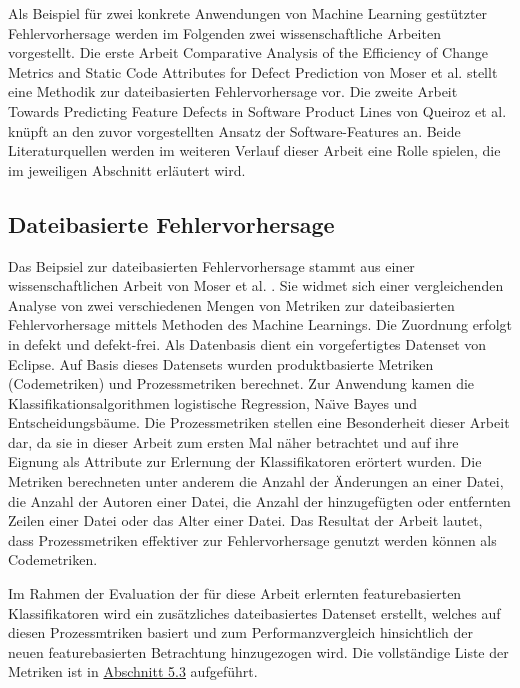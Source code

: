 Als Beispiel für zwei konkrete Anwendungen von Machine Learning gestützter Fehlervorhersage werden im Folgenden zwei wissenschaftliche Arbeiten vorgestellt. Die erste Arbeit \glqq Comparative Analysis of the Efficiency of Change Metrics and Static Code Attributes for Defect Prediction\grqq{} von Moser et al. \cite{Moser2008} stellt eine Methodik zur dateibasierten Fehlervorhersage vor. Die zweite Arbeit \glqq Towards Predicting Feature Defects in Software Product Lines\grqq{} von Queiroz et al. \cite{Queiroz2016} knüpft an den zuvor vorgestellten Ansatz der Software-Features an. Beide Literaturquellen werden im weiteren Verlauf dieser Arbeit eine Rolle spielen, die im jeweiligen Abschnitt erläutert wird.

\subsection*{Dateibasierte Fehlervorhersage}
Das Beipsiel zur dateibasierten Fehlervorhersage stammt aus einer wissenschaftlichen Arbeit von Moser et al. \cite{Moser2008}. Sie widmet sich einer vergleichenden Analyse von zwei verschiedenen Mengen von Metriken zur dateibasierten Fehlervorhersage mittels Methoden des Machine Learnings. Die Zuordnung erfolgt in \glqq defekt\grqq{} und \glqq defekt-frei\grqq. Als Datenbasis dient ein vorgefertigtes Datenset von Eclipse. Auf Basis dieses Datensets wurden \glqq produktbasierte\grqq{} Metriken (Codemetriken) und Prozessmetriken berechnet. Zur Anwendung kamen die Klassifikationsalgorithmen logistische Regression, Na\"{\i}ve Bayes und Entscheidungsbäume. Die Prozessmetriken stellen eine Besonderheit dieser Arbeit dar, da sie in dieser Arbeit zum ersten Mal näher betrachtet und auf ihre Eignung als Attribute zur Erlernung der Klassifikatoren erörtert wurden. Die Metriken berechneten unter anderem die Anzahl der Änderungen an einer Datei, die Anzahl der Autoren einer Datei, die Anzahl der hinzugefügten oder entfernten Zeilen einer Datei oder das Alter einer Datei. Das Resultat der Arbeit lautet, dass Prozessmetriken effektiver zur Fehlervorhersage genutzt werden können als Codemetriken.

Im Rahmen der Evaluation der für diese Arbeit erlernten featurebasierten Klassifikatoren wird ein zusätzliches dateibasiertes Datenset erstellt, welches auf diesen Prozessmtriken basiert und zum Performanzvergleich hinsichtlich der neuen featurebasierten Betrachtung hinzugezogen wird. Die vollständige Liste der Metriken ist in \hyperref[classic-eval]{Abschnitt 5.3} aufgeführt.


